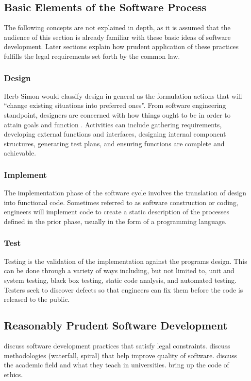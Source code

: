 \documentclass[12pt]{report}
\begin{document}
\subsection{Basic Elements of the Software Process} 
The following concepts are not explained in depth, as it is assumed that the audience of this section is already familiar with these basic ideas of software development. Later sections explain how prudent application of these practices fulfills the legal requirements set forth by the common law. 

\subsubsection{Design} 
Herb Simon would classify design in general as the formulation actions that will ``change existing situations into preferred ones''. From software engineering standpoint, designers are concerned with how things ought to be in order to attain goals and function \cite{simon}. Activities can include gathering requirements, developing external functions and interfaces, designing internal component structures, generating test plans, and ensuring functions are complete and achievable. 

\subsubsection{Implement} 
The implementation phase of the software cycle involves the translation of design into functional code. Sometimes referred to as software construction or coding, engineers will implement code to create a static description of the processes defined in the prior phase, usually in the form of a programming language. 

\subsubsection{Test} 
Testing is the validation of the implementation against the programs design. This can be done through a variety of ways including, but not limited to, unit and system testing, black box testing, static code analysis, and automated testing. Testers seek to discover defects so that engineers can fix them before the code is released to the public. 

\subsection{Reasonably Prudent Software Development} 
discuss software development practices that satisfy legal constraints. discuss methodologies (waterfall, spiral) that help improve quality of software. discuss the academic field and what they teach in universities. bring up the code of ethics.  
\end{document}
